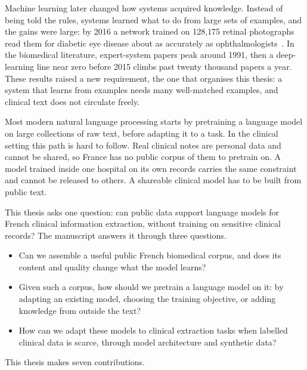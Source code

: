 Machine learning later changed how systems acquired knowledge. Instead of being
told the rules, systems learned what to do from large sets of examples, and the
gains were large: by 2016 a network trained on 128{,}175 retinal photographs read
them for diabetic eye disease about as accurately as
ophthalmologists~\citep{gulshan_2016}. In the biomedical literature, expert-system
papers peak around 1991, then a deep-learning line near zero before 2015 climbs past
twenty thousand papers a year. These results raised a new requirement, the one that
organises this thesis: a system that learns from examples needs many well-matched
examples, and clinical text does not circulate freely.

Most modern natural language processing starts by pretraining a language model on
large collections of raw text, before adapting it to a task. In the clinical
setting this path is hard to follow. Real clinical notes are personal data and
cannot be shared, so France has no public corpus of them to pretrain on. A model
trained inside one hospital on its own records carries the same constraint and
cannot be released to others. A shareable clinical model has to be built from
public text.

This thesis asks one question: can public data support language models for French
clinical information extraction, without training on sensitive clinical records?
The manuscript answers it through three questions.

\begin{itemize}
  \item Can we assemble a useful public French biomedical corpus, and does its content and quality change what the model learns?
  \item Given such a corpus, how should we pretrain a language model on it: by adapting an existing model, choosing the training objective, or adding knowledge from outside the text?
  \item How can we adapt these models to clinical extraction tasks when labelled clinical data is scarce, through model architecture and synthetic data?
\end{itemize}

\noindent This thesis makes seven contributions.

